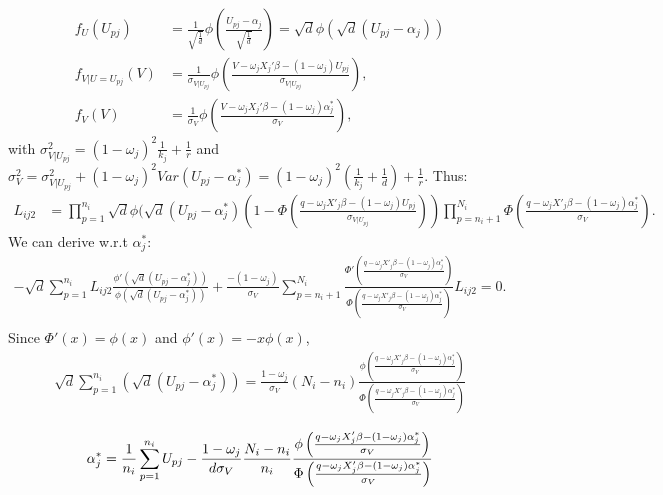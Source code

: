 \begin{align*}
	f_{U}(U_{p j})&=\frac{1}{\sqrt{\frac{1}{d}}}\phi\left(\frac{U_{p j}-\alpha_{j}}{\sqrt{\frac{1}{d}}}\right)=\sqrt{d}\phi(\sqrt{d}(U_{p j}-\alpha_{j}))\\
	f_{V|U=U_{p j}}(V)&=\frac{1}{\sigma_{V|U_{p j}}}\phi\left(\frac{V-\omega_{j} X_{j}'\beta-(1-\omega_{j})U_{p j}}{\sigma_{V|U_{p j}}}\right),\\
	f_{V}(V)&=\frac{1}{\sigma_{V}}\phi\left(\frac{V-\omega_{j} X_{j}'\beta-(1-\omega_{j})\alpha_{j}^{*}}{\sigma_{V}}\right),
\end{align*}
	with $\sigma_{V|U_{p j}}^{2}=(1-\omega_{j})^{2}\frac{1}{k_{j}}+\frac{1}{r}$ and $\sigma_{V}^{2}=\sigma_{V|U_{p j}}^{2}+(1-\omega_{j})^{2}Var(U_{p j}-\alpha_{j}^{*})=(1-\omega_{j})^{2}(\frac{1}{k_{j}}+\frac{1}{d})+\frac{1}{r}$.
Thus:
\begin{align*}
	L_{i j 2}&=\prod_{p=1}^{n_{i}}\sqrt{d}\phi(\sqrt{d}(U_{p j}-\alpha_{j}^{*})\left(1-\Phi\left(\frac{q-\omega_{j}X'_{j}\beta-(1-\omega_{j})U_{p j}}{\sigma_{V|U_{p j}}}\right)\right)
	\prod_{p=n_{i}+1}^{N_{i}}\Phi\left(\frac{q-\omega_{j}X'_{j}\beta-(1-\omega_{j})\alpha_{j}^{*}}{\sigma_{V}}\right).
\end{align*}
We can derive w.r.t $\alpha_{j}^{*}$:
\begin{align*}
	-\sqrt{d}\sum_{p=1}^{n_{i}}L_{i j 2}\frac{\phi'(\sqrt{d}(U_{p j}-\alpha_{j}^{*}))}{\phi(\sqrt{d}(U_{p j}-\alpha_{j}^{*}))}
	+\frac{-(1-\omega_{j})}{\sigma_{V}}\sum_{p=n_{i}+1}^{N_{i}}\frac{\Phi'\left(\frac{q-\omega_{j}X'_{j}\beta-(1-\omega_{j})\alpha_{j}^{*}}{\sigma_{V}}\right)}{\Phi\left(\frac{q-\omega_{j}X'_{j}\beta-(1-\omega_{j})\alpha_{j}^{*}}{\sigma_{V}}\right)}L_{i j 2}=0.\\
\end{align*}
Since $\Phi'(x)=\phi(x)$ and $\phi'(x)=-x\phi(x)$,
\begin{align*}	
	\sqrt{d}\sum_{p=1}^{n_{i}}(\sqrt{d}(U_{p j}-\alpha_{j}^{*}))
	=\frac{1-\omega_{j}}{\sigma_{V}}(N_{i}-n_{i})\frac{\phi\left(\frac{q-\omega_{j}X'_{j}\beta-(1-\omega_{j})\alpha_{j}^{*}}{\sigma_{V}}\right)}{\Phi\left(\frac{q-\omega_{j}X'_{j}\beta-(1-\omega_{j})\alpha_{j}^{*}}{\sigma_{V}}\right)}\\	
\end{align*}
\begin{equation}
	\alpha_{j}^{*}=\frac{1}{n_{i}}\sum_{p=1}^{n_{i}}U_{p j}-\frac{1-\omega_{j}}{d\sigma_{V}}\frac{N_{i}-n_{i}}{n_{i}}\frac{\phi\left(\frac{q-\omega_{j}X'_{j}\beta-(1-\omega_{j})\alpha_{j}^{*}}{\sigma_{V}}\right)}{\Phi\left(\frac{q-\omega_{j}X'_{j}\beta-(1-\omega_{j})\alpha_{j}^{*}}{\sigma_{V}}\right)}\\
\end{equation}
	

